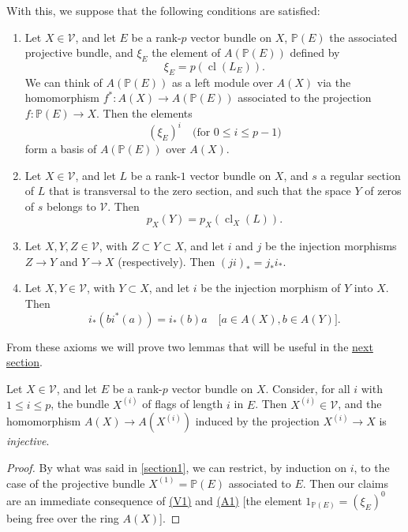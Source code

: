 \documentclass{article}
\theoremstyle{plain}
\newenvironment{lemma}[1]
    {\renewcommand\theinnercustomlemma{#1}\innercustomlemma}
    {\endinnercustomlemma}
\theoremstyle{definition}
\newcommand{\cat}[1]{{\mathcal{#1}}}
\renewcommand{\leq}{\leqslant}
\DeclareMathOperator{\cl}{cl}
\newcommand{\oldpage}[1]{\marginpar{\footnotesize$\Big\vert$ \textit{p.~#1}}}
\begin{document}
With this, we suppose that the following conditions are satisfied:
\begin{enumerate}[({A}1)]
  \item\label{axiomA1}
    Let $X\in\cat{V}$, and let $E$ be a rank-$p$ vector bundle on $X$, $\mathbb{P}(E)$ the associated projective bundle, and $\xi_E$ the element of $A(\mathbb{P}(E))$ defined by
    \[
      \xi_E = p(\cl(L_E)).
    \]
    We can think of $A(\mathbb{P}(E))$ as a left module over $A(X)$ via the homomorphism $f^*\colon A(X)\to A(\mathbb{P}(E))$ associated to the projection $f\colon\mathbb{P}(E)\to X$.
    Then the elements
    \[
      (\xi_E)^i
      \quad\mbox{(for $0\leq i\leq p-1$)}
    \]
    form a basis of $A(\mathbb{P}(E))$ over $A(X)$.
  \item\label{axiomA2}
    Let $X\in\cat{V}$, and let $L$ be a rank-$1$ vector bundle on $X$, and $s$ a regular section of $L$ that is transversal to the zero section, and such that the space $Y$ of zeros of $s$ belongs to $\cat{V}$.
    Then
    \[
      p_X(Y) = p_X(\cl_X(L)).
    \]
  \item\label{axiomA3}
    Let $X,Y,Z\in\cat{V}$, with $Z\subset Y\subset X$, and let $i$ and $j$ be the injection morphisms $Z\to Y$ and $Y\to X$ (respectively).
    Then $(ji)_* = j_*i_*$.
  \item\label{axiomA4}
    Let $X,Y\in\cat{V}$, with $Y\subset X$, and let $i$ be the injection morphism of $Y$
\oldpage{141}
  into $X$.
    Then
    \[
      i_*(bi^*(a)) = i_*(b)a
      \quad\mbox{[$a\in A(X),b\in A(Y)$].}
    \]
\end{enumerate}

From these axioms we will prove two lemmas that will be useful in the \hyperref[section3]{next section}.

\begin{lemma}{1}
\label{lemma1}
  Let $X\in\cat{V}$, and let $E$ be a rank-$p$ vector bundle on $X$.
  Consider, for all $i$ with $1\leq i\leq p$, the bundle $X^{(i)}$ of flags of length $i$ in $E$.
  Then $X^{(i)}\in\cat{V}$, and the homomorphism $A(X)\to A(X^{(i)})$ induced by the projection $X^{(i)}\to X$ is \emph{injective}.
\end{lemma}

\begin{proof}
  By what was said in \cref{section1}, we can restrict, by induction on $i$, to the case of the projective bundle $X^{(1)}=\mathbb{P}(E)$ associated to $E$.
  Then our claims are an immediate consequence of \hyperref[axiomV1]{(V1)} and \hyperref[axiomA1]{(A1)} [the element $1_{\mathbb{P}(E)}=(\xi_E)^0$ being free over the ring $A(X)$].
\end{proof}
\end{document}
